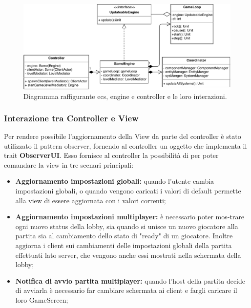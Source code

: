 \begin{figure}[H]
	\centering
	\includegraphics[width=\columnwidth]{drawio/ECS-engine-controller/ecs-engine-controller.pdf}
	\caption{Diagramma raffigurante ecs, engine e controller e le loro interazioni.}
	\label{fig:ecs-engine-controller}
\end{figure}



\subsubsection{Interazione tra Controller e View}
Per rendere possibile l'aggiornamento della View da parte del controller è stato utilizzato il pattern observer, fornendo al controller un oggetto che implementa il trait \textbf{ObserverUI}. Esso fornisce al controller la possibilità di per poter comandare la view in tre scenari principali:


\begin{itemize}
    \item \textbf{Aggiornamento impostazioni globali:} quando l'utente cambia impostazioni globali, o quando vengono caricati i valori di default permette alla view di essere aggiornata con i valori correnti;
    
    \item \textbf{Aggiornamento impostazioni multiplayer:} è necessario poter mos-trare ogni nuovo status della lobby, sia quando si unisce un nuovo giocatore alla partita sia al cambiamento dello stato di "ready" di un giocatore. Inoltre aggiorna i client sui cambiamenti delle impostazioni globali della partita effettuati lato server, che vengono anche essi mostrati nella schermata della lobby;
    
    \item \textbf{Notifica di avvio partita multiplayer:} quando l'host della partita decide di avviarla è necessario far cambiare schermata ai client e fargli caricare il loro GameScreen;
    
\end{itemize}

